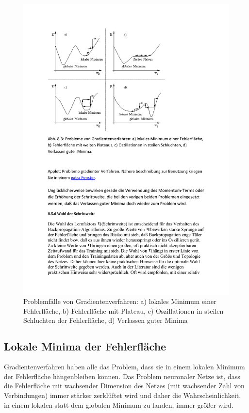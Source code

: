 \begin{figure}[ht!] \centering 
	\includegraphics[width=\linewidth]{figures/ch03_fehler-gradientenverfahren.pdf}
	\caption{Problemfälle von Gradientenverfahren: a) lokales Minimum einer Fehlerfläche, b) Fehlerfläche mit Plateau, c) Oszillationen in steilen Schluchten der Fehlerfläche, d) Verlassen guter Minima}
	\label{fig:ch03_sigmoid}
\end{figure}

\subsection*{Lokale Minima der Fehlerfläche}
Gradientenverfahren haben alle das Problem, dass sie in einem lokalen Minimum der Fehlerfläche hängenbleiben können.
Das Problem neuronaler Netze ist, dass die Fehlerfläche mit wachsender Dimension des Netzes (mit wachsender Zahl von Verbindungen) immer stärker zerklüftet wird und daher die Wahrscheinlichkeit, in einem lokalen statt dem globalen Minimum zu landen, immer größer wird.

